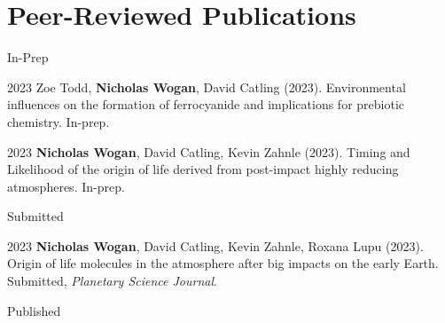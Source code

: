 \documentclass{article}
\begin{document}
\section{Peer-Reviewed Publications}

\noindent In-Prep

\begin{cvlist}
\item[2023]
  Zoe Todd, \textbf{Nicholas Wogan}, David Catling (2023). Environmental influences on the formation of ferrocyanide and implications for prebiotic chemistry. In-prep.
\item[2023]
  \textbf{Nicholas Wogan}, David Catling, Kevin Zahnle (2023). Timing and Likelihood of the origin of life derived from post-impact highly reducing atmospheres. In-prep.
\end{cvlist}

\noindent  Submitted

\begin{cvlist}
\item[2023]
  \textbf{Nicholas Wogan}, David Catling, Kevin Zahnle, Roxana Lupu (2023). Origin of life molecules in the atmosphere after big impacts on the early Earth. Submitted, \emph{Planetary Science Journal}.
\end{cvlist}

\noindent Published
\end{document}
